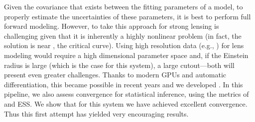 Given the covariance that exists between the fitting parameters of a model, 
to properly estimate the uncertainties of these parameters, 
it is best to perform full forward modeling.
However, to take this approach for strong lensing is challenging given that it is inherently a highly nonlinear problem 
(in fact, the solution is near , the critical curve).
Using high resolution data (e.g., \hst) for lens modeling would require a high dimensional parameter space and, if the Einstein radius is large (which is the case for this system), a large cutout---both will present even greater challenges.
Thanks to modern GPUs and automatic differentiation, 
this became possible in recent years and we developed \gigal.
In this pipeline, we also assess convergence for statistical inference, 
using the metrics of \rhat and ESS.
We show that for this system we have achieved excellent convergence.
Thus this first attempt has yielded very encouraging results.


